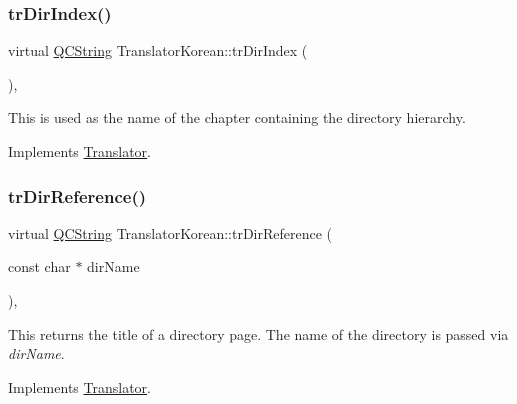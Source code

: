 \mbox{\label{class_translator_korean_a5c4fd5ffbb44f7651f9808b7ca324d1b}} 
\subsubsection{\texorpdfstring{trDirIndex()}{trDirIndex()}}
{\footnotesize\ttfamily virtual \mbox{\hyperlink{class_q_c_string}{Q\+C\+String}} Translator\+Korean\+::tr\+Dir\+Index (\begin{DoxyParamCaption}{ }\end{DoxyParamCaption})\hspace{0.3cm}{\ttfamily [inline]}, {\ttfamily [virtual]}}

This is used as the name of the chapter containing the directory hierarchy. 

Implements \mbox{\hyperlink{class_translator}{Translator}}.

\mbox{\label{class_translator_korean_aacccc418b93495543610b3df476d404f}} 
\subsubsection{\texorpdfstring{trDirReference()}{trDirReference()}}
{\footnotesize\ttfamily virtual \mbox{\hyperlink{class_q_c_string}{Q\+C\+String}} Translator\+Korean\+::tr\+Dir\+Reference (\begin{DoxyParamCaption}\item[{const char $\ast$}]{dir\+Name }\end{DoxyParamCaption})\hspace{0.3cm}{\ttfamily [inline]}, {\ttfamily [virtual]}}

This returns the title of a directory page. The name of the directory is passed via {\itshape dir\+Name}. 

Implements \mbox{\hyperlink{class_translator}{Translator}}.

\mbox{\label{class_translator_korean_a4d9d74872c9696604dc312f9df8b2eb5}} 

